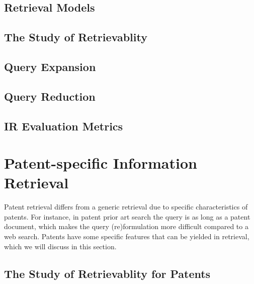 \subsection{Retrieval Models}
\label{subsub:retmodels}


\subsection{The Study of Retrievablity}

\label{subsub:retrievability}

\subsection{Query Expansion}


\subsection{Query Reduction}

%

\subsection{IR Evaluation Metrics}



\section{Patent-specific Information Retrieval}
\label{subsec:patentir}
Patent retrieval differs from a generic retrieval due to specific characteristics of patents. For instance, in patent prior art search the query is as long as a patent document, which makes the query (re)formulation more difficult compared to a web search. Patents have some specific features that can be yielded in retrieval, which we will  discuss in this section.

\subsection{The Study of Retrievablity for Patents}


